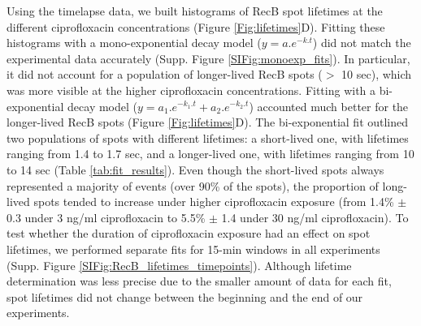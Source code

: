 Using the timelapse data, we built histograms of RecB spot lifetimes at the different ciprofloxacin concentrations (Figure \ref{Fig:lifetimes}D). Fitting these histograms with a mono-exponential decay model ($y = a.e^{-k.t}$) did not match the experimental data accurately (Supp. Figure \ref{SIFig:monoexp_fits}). In particular, it did not account for a population of longer-lived RecB spots ($>$ 10 sec), which was more visible at the higher ciprofloxacin concentrations. Fitting with a bi-exponential decay model ($y = a_1.e^{-k_1.t} + a_2.e^{-k_2.t}$) accounted much better for the longer-lived RecB spots (Figure \ref{Fig:lifetimes}D). The bi-exponential fit outlined two populations of spots with different lifetimes: a short-lived one, with lifetimes ranging from 1.4 to 1.7 sec, and a longer-lived one, with lifetimes ranging from 10 to 14 sec (Table \ref{tab:fit_results}). Even though the short-lived spots always represented a majority of events (over 90\% of the spots), the proportion of long-lived spots tended to increase under higher ciprofloxacin exposure (from 1.4\% $\pm$ 0.3 under 3 ng/ml ciprofloxacin to 5.5\% $\pm$ 1.4 under 30 ng/ml ciprofloxacin). To test whether the duration of ciprofloxacin exposure had an effect on spot lifetimes, we performed separate fits for 15-min windows in all experiments (Supp. Figure \ref{SIFig:RecB_lifetimes_timepoints}). Although lifetime determination was less precise due to the smaller amount of data for each fit, spot lifetimes did not change between the beginning and the end of our experiments.

